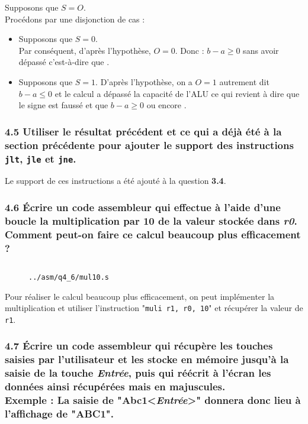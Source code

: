 \documentclass[twoside, 12pt, a4paper]{article}
\newcommand{\fm}[2]{
\begin{figure}[!h]
    \centering
    \inputminted[]{asm}{#1}
    \caption{\texttt{#2}}
\end{figure}
}
\begin{document}
        \framebox[1cm][c]{$\impliedby$} Supposons que $S = O$. \\
        Procédons par une disjonction de cas :
        \begin{itemize}
            \item Supposons que $S = 0$. \\
            Par conséquent, d'après l'hypothèse, $O = 0$.
            Donc : $b-a \geq 0$ sans avoir dépassé c'est-à-dire que .
            \item Supposons que $S = 1$.
            D'après l'hypothèse, on a $O = 1$ autrement dit $b-a \leq 0$ et le calcul a dépassé la capacité de l'ALU ce qui revient à dire que le signe est faussé et que $b-a \geq 0$ ou encore .
        \end{itemize}
                
        \subsubsection*{\textbf{4.5} Utiliser le résultat précédent et ce qui a déjà été à la section précédente pour ajouter le support des instructions \texttt{jlt}, \texttt{jle} et \texttt{jne}.}

Le support de ces instructions a été ajouté à la question \textbf{3.4}.
        
        \subsubsection*{\textbf{4.6} Écrire un code assembleur qui effectue à l'aide d'une boucle la multiplication par 10 de la valeur stockée dans \textit{r0}.\\
        Comment peut-on faire ce calcul beaucoup plus efficacement ?}


\fm{../asm/q4_6/mul10.s}{../asm/q4\_6/mul10.s}

Pour réaliser le calcul beaucoup plus efficacement, on peut implémenter la multiplication et utiliser l'instruction "\texttt{muli r1, r0, 10}" et récupérer la valeur de \texttt{r1}.

\clearpage
        
        \subsubsection*{\textbf{4.7} Écrire un code assembleur qui récupère les touches saisies par l'utilisateur et les stocke en mémoire jusqu'à la saisie de la touche \textit{Entrée}, puis qui réécrit à l'écran les données ainsi récupérées mais en majuscules.\\
        \textbf{Exemple : } La saisie de "Abc1<\textit{Entrée}>" donnera donc lieu à l'affichage de "ABC1".}
\end{document}
